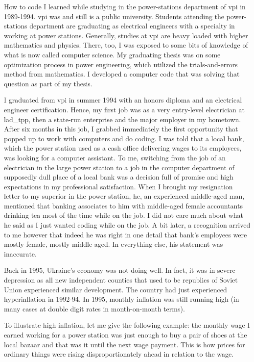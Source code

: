How to code I learned while studying in the power-stations department of \ac{vpi} in 1989-1994.  \ac{vpi} was and still is a public university. Students attending the power-stations department are graduating as electrical engineers with a specialty in working at power stations. Generally, studies at \ac{vpi} are heavy loaded with higher mathematics and physics. There, too, I was exposed to some bits of knowledge of what is now called computer science. My graduating thesis was on some optimization process in power engineering, which utilized the trials-and-errors method from mathematics. I developed a computer code that was solving that question as part of my thesis.

I graduated from \ac{vpi} in summer 1994 with an honors diploma and an electrical engineer certification. Hence, my first job was as a very entry-level electrician at \ac{lad_tpp}, then a state-run enterprise and the major employer in my hometown. After six months in this job, I grabbed immediately the first opportunity that popped up to work with computers and do coding. I was told that a local bank, which the power station used as a cash office delivering wages to its employees, was looking for a computer assistant. To me, switching from the job of an electrician in the large power station to a job in the computer department of supposedly dull place of a local bank was a decision full of promise and high expectations in my professional satisfaction. When I brought my resignation letter to my superior in the power station, he, an experienced middle-aged man, mentioned that banking associates to him with middle-aged female accountants drinking tea most of the time while on the job. I did not care much about what he said as I just wanted coding while on the job. A bit later, a recognition arrived to me however that indeed he was right in one detail that bank's employees were mostly female, mostly middle-aged. In everything else, his statement was inaccurate. 

Back in 1995, Ukraine's economy was not doing well. In fact, it was in severe depression as all new independent counties that used to be republics of Soviet Union experienced similar development. The country had just experienced hyperinflation in 1992-94. In 1995, monthly inflation was still running high (in many cases at double digit rates in month-on-month terms). 

To illustrate high inflation, let me give the following example: the monthly wage I earned working for a power station was just enough to buy a pair of shoes at the local bazaar and that was it until the next wage payment. This is how prices for ordinary things were rising disproportionately ahead in relation to the wage. 

